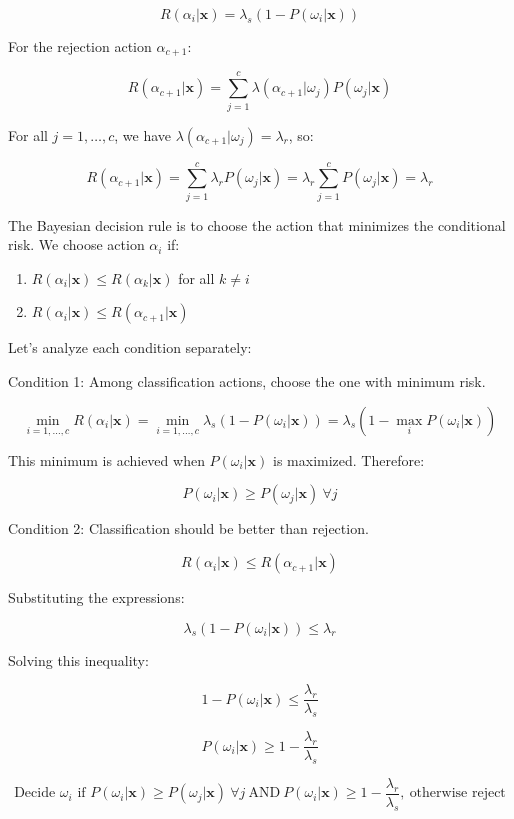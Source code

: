 \documentclass[12pt]{article}
\begin{document}
\[
R(\alpha_i|\mathbf{x}) = \lambda_s(1 - P(\omega_i|\mathbf{x}))
\]


For the rejection action $\alpha_{c+1}$:

\[
R(\alpha_{c+1}|\mathbf{x}) = \sum_{j=1}^c \lambda(\alpha_{c+1}|\omega_j)P(\omega_j|\mathbf{x})
\]

For all $j = 1, \ldots, c$, we have $\lambda(\alpha_{c+1}|\omega_j) = \lambda_r$, so:

\[
R(\alpha_{c+1}|\mathbf{x}) = \sum_{j=1}^c \lambda_r P(\omega_j|\mathbf{x}) = \lambda_r \sum_{j=1}^c P(\omega_j|\mathbf{x}) = \lambda_r
\]


The Bayesian decision rule is to choose the action that minimizes the conditional risk. We choose action $\alpha_i$ if:
\begin{enumerate}
    \item $R(\alpha_i|\mathbf{x}) \leq R(\alpha_k|\mathbf{x})$ for all $k \neq i$
    \item $R(\alpha_i|\mathbf{x}) \leq R(\alpha_{c+1}|\mathbf{x})$
\end{enumerate}

Let's analyze each condition separately:

Condition 1: Among classification actions, choose the one with minimum risk.

\[
\min_{i=1,\ldots,c} R(\alpha_i|\mathbf{x}) = \min_{i=1,\ldots,c} \lambda_s(1 - P(\omega_i|\mathbf{x})) = \lambda_s(1 - \max_{i} P(\omega_i|\mathbf{x}))
\]

This minimum is achieved when $P(\omega_i|\mathbf{x})$ is maximized. Therefore:

\[
P(\omega_i|\mathbf{x}) \geq P(\omega_j|\mathbf{x}) \ \forall j
\]

Condition 2: Classification should be better than rejection.

\[
R(\alpha_i|\mathbf{x}) \leq R(\alpha_{c+1}|\mathbf{x})
\]

Substituting the expressions:

\[
\lambda_s(1 - P(\omega_i|\mathbf{x})) \leq \lambda_r
\]

Solving this inequality:

\[
1 - P(\omega_i|\mathbf{x}) \leq \frac{\lambda_r}{\lambda_s}
\]

\[
P(\omega_i|\mathbf{x}) \geq 1 - \frac{\lambda_r}{\lambda_s}
\]

\[
\boxed{\text{Decide } \omega_i \text{ if } P(\omega_i|\mathbf{x}) \geq P(\omega_j|\mathbf{x}) \ \forall j \ \text{AND} \ P(\omega_i|\mathbf{x}) \geq 1 - \frac{\lambda_r}{\lambda_s}, \ \text{otherwise reject}}
\]
\end{document}
